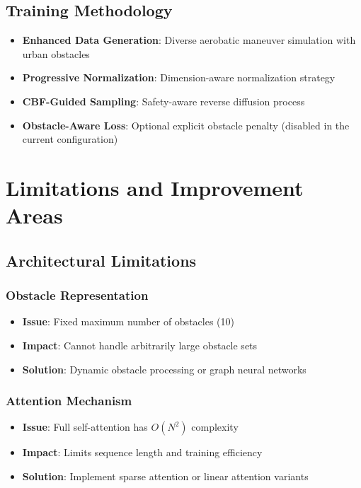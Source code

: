 \documentclass[12pt]{article}
\begin{document}
\subsection{Training Methodology}

\begin{itemize}
    \item \textbf{Enhanced Data Generation}: Diverse aerobatic maneuver simulation with urban obstacles
    \item \textbf{Progressive Normalization}: Dimension-aware normalization strategy
    \item \textbf{CBF-Guided Sampling}: Safety-aware reverse diffusion process
    \item \textbf{Obstacle-Aware Loss}: Optional explicit obstacle penalty (disabled in the current configuration)
\end{itemize}

\section{Limitations and Improvement Areas}

\subsection{Architectural Limitations}

\subsubsection{Obstacle Representation}

\begin{itemize}
    \item \textbf{Issue}: Fixed maximum number of obstacles (10)
    \item \textbf{Impact}: Cannot handle arbitrarily large obstacle sets
    \item \textbf{Solution}: Dynamic obstacle processing or graph neural networks
\end{itemize}

\subsubsection{Attention Mechanism}

\begin{itemize}
    \item \textbf{Issue}: Full self-attention has $O(N^2)$ complexity
    \item \textbf{Impact}: Limits sequence length and training efficiency
    \item \textbf{Solution}: Implement sparse attention or linear attention variants
\end{itemize}
\end{document}
